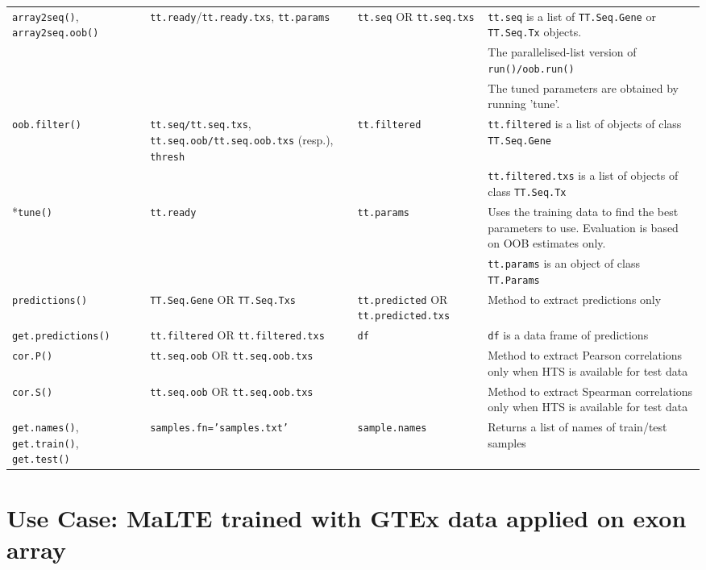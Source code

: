 \documentclass[a4paper,12pt]{article}
\begin{document}
\begin{table}[H]
\begin{tabular}{|p{2.5cm}|p{4cm}|p{4cm}|p{5cm}|}
\hline
\texttt{array2seq()}, \texttt{array2seq.oob()} & \texttt{tt.ready}/\texttt{tt.ready.txs}, \texttt{tt.params} & \texttt{tt.seq} OR \texttt{tt.seq.txs} & \texttt{tt.seq} is a list of \texttt{TT.Seq.Gene} or \texttt{TT.Seq.Tx} objects. \\
 & & & The parallelised-list version of \texttt{run()/oob.run()} \\
 & & & The tuned parameters are obtained by running 'tune'. \\
\hline
\texttt{oob.filter()} & \texttt{tt.seq/tt.seq.txs}, \texttt{tt.seq.oob/tt.seq.oob.txs} (resp.), \texttt{thresh} & \texttt{tt.filtered} & \texttt{tt.filtered} is a list of objects of class \texttt{TT.Seq.Gene} \\
 & & & \texttt{tt.filtered.txs} is a list of objects of class \texttt{TT.Seq.Tx} \\
\hline
*\texttt{tune()} & \texttt{tt.ready} & \texttt{tt.params} & Uses the training data to find the best parameters to use. Evaluation is based on OOB estimates only. \\
 & & & \texttt{tt.params} is an object of class \texttt{TT.Params} \\
\hline
\texttt{predictions()} & \texttt{TT.Seq.Gene} OR \texttt{TT.Seq.Txs} & \texttt{tt.predicted} OR \texttt{tt.predicted.txs} & Method to extract predictions only \\
\hline
\texttt{get.predictions()} & \texttt{tt.filtered} OR \texttt{tt.filtered.txs} & \texttt{df} & \texttt{df} is a data frame of predictions \\
\hline
\texttt{cor.P()} & \texttt{tt.seq.oob} OR \texttt{tt.seq.oob.txs} &  & Method to extract Pearson correlations only when HTS is available for test data \\
\hline
\texttt{cor.S()} & \texttt{tt.seq.oob} OR \texttt{tt.seq.oob.txs} &  & Method to extract Spearman correlations only when HTS is available for test data \\
\hline
\texttt{get.names()}, \texttt{get.train()}, \texttt{get.test()} & \texttt{samples.fn='samples.txt'} & \texttt{sample.names} & Returns a list of names of train/test samples \\
\hline
\end{tabular}
\end{table}

\pagebreak
\section{Use Case: MaLTE trained with GTEx data applied on exon array}
\end{document}
